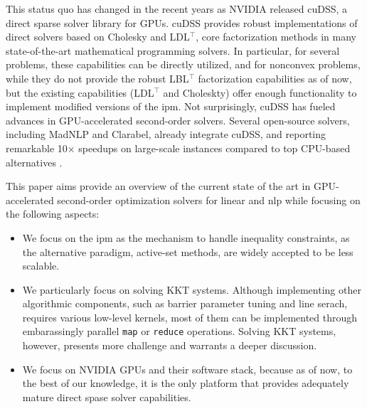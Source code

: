 \documentclass{article}
\begin{document}
This status quo has changed in the recent years as NVIDIA released cuDSS, a direct sparse solver library for GPUs. cuDSS provides robust implementations of direct solvers based on Cholesky and LDL$^\top$, core factorization methods in many state-of-the-art mathematical programming solvers. In particular, for several problems, these capabilities can be directly utilized, and for nonconvex problems, while they do not provide the robust LBL$^\top$ factorization capabilities as of now, but the existing capabilities (LDL$^\top$ and Choleskty) offer enough functionality to implement modified versions of the \gls*{ipm}. Not surprisingly, cuDSS has fueled advances in GPU-accelerated second-order solvers. Several open-source solvers, including MadNLP and Clarabel, already integrate cuDSS, and reporting remarkable 10× speedups on large-scale instances compared to top CPU-based alternatives \cite{}. 

This paper aims provide an overview of the current state of the art in GPU-accelerated second-order optimization solvers for linear and \gls*{nlp} while focusing on the following aspects:
\begin{itemize}[leftmargin=*,itemsep=0pt,parsep=0pt,partopsep=0pt]
\item We focus on the \gls*{ipm} as the mechanism to handle inequality constraints, as the alternative paradigm, active-set methods, are widely accepted to be less scalable.
\item We particularly focus on solving KKT systems. Although implementing other algorithmic components, such as barrier parameter tuning and line serach, requires various low-level kernels, most of them can be implemented through embarassingly parallel \texttt{map} or \texttt{reduce} operations. Solving KKT systems, however, presents more challenge and warrants a deeper discussion.
\item We focus on NVIDIA GPUs and their software stack, because as of now, to the best of our knowledge, it is the only platform that provides adequately mature direct spase solver capabilities.
\end{itemize}

\end{document}
